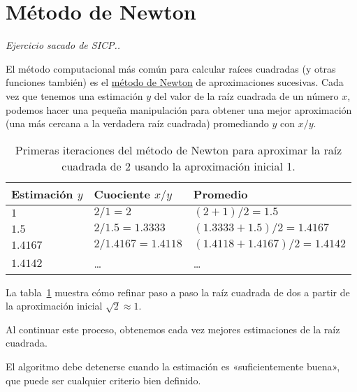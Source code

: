 \section{Método de Newton}

\emph{
  Ejercicio sacado de \emph{SICP}.\footnotemark.
}

El método computacional más común para calcular raíces cuadradas
(y otras funciones también) es el
\href{http://es.wikipedia.org/wiki/M\%C3\%A9todo\_de\_Newton}{método de Newton}
de aproximaciones sucesivas. Cada vez que tenemos una estimación
\(y\) del valor de la raíz cuadrada de un número \(x\), podemos hacer una
pequeña manipulación para obtener una mejor aproximación (una más
cercana a la verdadera raíz cuadrada) promediando \(y\) con \(x/y\).

\begin{table}
  \centering
  \begin{tabular}{lll}
    \toprule
      Estimación \(y\) & Cuociente \(x/y\)     & Promedio \\
    \midrule
      \(1\)            & \(2/1      = 2\)      & \((2 + 1)          /2 = 1.5\)    \\
      \(1.5\)          & \(2/1.5    = 1.3333\) & \((1.3333 + 1.5 )  /2 = 1.4167\) \\
      \(1.4167\)       & \(2/1.4167 = 1.4118\) & \((1.4118 + 1.4167)/2 = 1.4142\) \\
      \(1.4142\)       & \ldots{}              & \ldots{} \\
    \bottomrule
  \end{tabular}
  \label{tbl:iteraciones-newton}
  \caption{Primeras iteraciones del método de Newton para aproximar la raíz cuadrada de 2
    usando la aproximación inicial 1.}
\end{table}

La tabla~\ref{tbl:iteraciones-newton} muestra cómo refinar paso a paso
la raíz cuadrada de dos a partir de la aproximación inicial \(\sqrt{2}\approx 1\).

Al continuar este proceso, obtenemos cada vez mejores estimaciones de la
raíz cuadrada.

El algoritmo debe detenerse cuando la estimación es «suficientemente
buena», que puede ser cualquier criterio bien definido.

